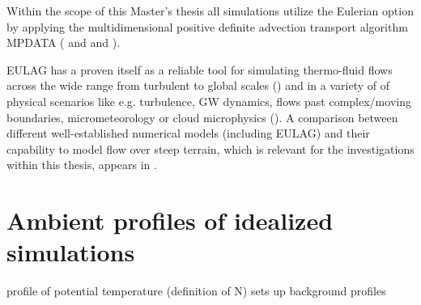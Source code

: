 Within the scope of this Master's thesis all simulations utilize the Eulerian option by applying the multidimensional positive definite advection transport algorithm MPDATA (\cite{smolarkiewicz_mpdata_1998} and  and \cite{smolarkiewicz_multidimensional_2006}).

EULAG has a proven itself as a reliable tool for simulating thermo-fluid flows across the wide range from turbulent to global scales (\cite{prusa_all-scale_2003}) and in a variety of of physical scenarios like e.g. turbulence, GW dynamics, flows past complex/moving boundaries, micrometeorology or cloud microphysics (\cite{prusa_eulag_2008}). A comparison between different well-established numerical models (including EULAG) and their capability to model flow over steep terrain, which is relevant for the investigations within this thesis, appears in \textcite{doyle_intercomparison_2011}.











\section{Ambient profiles of idealized simulations}
profile of potential temperature (definition of N) sets up background profiles


